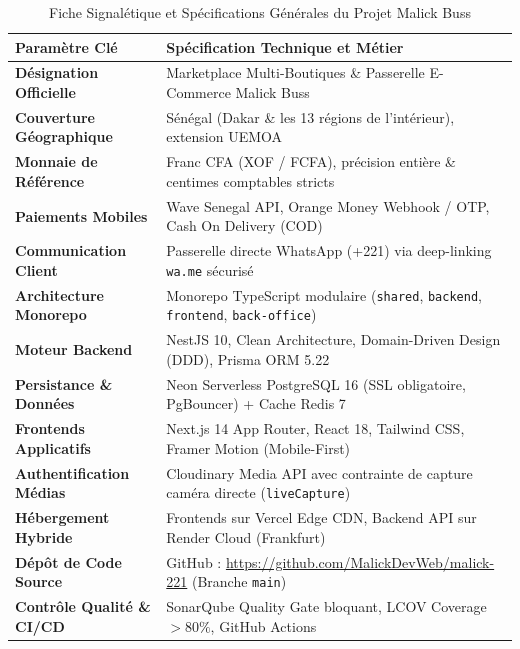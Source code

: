 \documentclass[11pt,a4paper,titlepage]{report}
\begin{document}
\begin{table}[h!]
\centering
\small
\begin{tabularx}{\textwidth}{@{}lX@{}}
\toprule
\rowcolor{tableheader}
\textbf{Paramètre Clé} & \textbf{Spécification Technique et Métier} \\
\midrule
\textbf{Désignation Officielle} & Marketplace Multi-Boutiques \& Passerelle E-Commerce Malick Buss \\
\textbf{Couverture Géographique} & Sénégal (Dakar \& les 13 régions de l'intérieur), extension UEMOA \\
\textbf{Monnaie de Référence} & Franc CFA (XOF / FCFA), précision entière \& centimes comptables stricts \\
\textbf{Paiements Mobiles} & Wave Senegal API, Orange Money Webhook / OTP, Cash On Delivery (COD) \\
\textbf{Communication Client} & Passerelle directe WhatsApp (+221) via deep-linking \texttt{wa.me} sécurisé \\
\textbf{Architecture Monorepo} & Monorepo TypeScript modulaire (\texttt{shared}, \texttt{backend}, \texttt{frontend}, \texttt{back-office}) \\
\textbf{Moteur Backend} & NestJS 10, Clean Architecture, Domain-Driven Design (DDD), Prisma ORM 5.22 \\
\textbf{Persistance \& Données} & Neon Serverless PostgreSQL 16 (SSL obligatoire, PgBouncer) + Cache Redis 7 \\
\textbf{Frontends Applicatifs} & Next.js 14 App Router, React 18, Tailwind CSS, Framer Motion (Mobile-First) \\
\textbf{Authentification Médias} & Cloudinary Media API avec contrainte de capture caméra directe (\texttt{liveCapture}) \\
\textbf{Hébergement Hybride} & Frontends sur Vercel Edge CDN, Backend API sur Render Cloud (Frankfurt) \\
\textbf{Dépôt de Code Source} & GitHub : \url{https://github.com/MalickDevWeb/malick-221} (Branche \texttt{main}) \\
\textbf{Contrôle Qualité \& CI/CD} & SonarQube Quality Gate bloquant, LCOV Coverage $> 80\%$, GitHub Actions \\
\bottomrule
\end{tabularx}
\caption{Fiche Signalétique et Spécifications Générales du Projet Malick Buss}
\end{table}

\newpage
\tableofcontents
\listoffigures
\listoftables
\newpage
\end{document}
